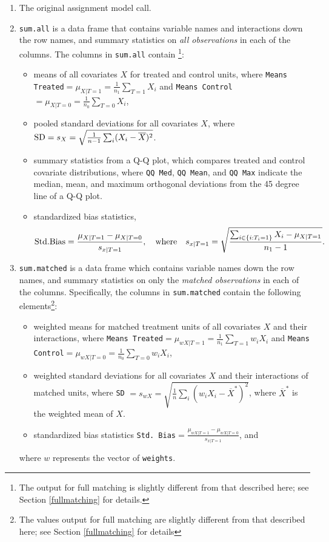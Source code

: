 \documentclass[oneside,letterpaper,titlepage]{article}
\begin{document}
\begin{enumerate}
\item The original assignment model call.
\item \texttt{sum.all} is a data frame that contains variable names
  and interactions down the row names, and summary statistics on
  \emph{all observations} in each of the columns.  The columns in
  \texttt{sum.all} contain \footnote{The output for full matching is
    slightly different from that described here; see Section
    \ref{fullmatching} for details.}:
  \begin{itemize}
  \item means of all covariates $X$ for treated and control units,
    where \texttt{Means Treated}$= \mu_{X|T=1} = \frac{1}{n_1}
    \sum_{T=1} X_i$ and \texttt{Means Control}$= \mu_{X|T=0} =
    \frac{1}{n_0} \sum_{T=0} X_i$,
  \item pooled standard deviations for all covariates $X$, where ${\rm
      SD} = s_X = \sqrt{\frac{1}{n-1} \sum_{i} (X_i -
      \overline{X})^2}$.
  \item summary statistics from a Q-Q plot, which compares treated and
    control covariate distributions, where \texttt{QQ Med}, \texttt{QQ
      Mean}, and \texttt{QQ Max} indicate the median, mean, and
    maximum orthogonal deviations from the 45 degree line of a Q-Q
    plot.
  \item standardized bias statistics, $${\rm Std.
      Bias}=\frac{\mu_{X|T=1} - \mu_{X|T=0}}{s_{x|T=1}}, \quad {\rm
      where} \quad s_{x|T=1} = \sqrt{\frac{\sum_{i \in \{i: T_i=1\}}
        X_i - \mu_{X|T=1}}{n_1-1} }.$$
  \end{itemize}
  
\item \texttt{sum.matched} is a data frame which contains variable
  names down the row names, and summary statistics on only the
  \emph{matched observations} in each of the columns.  Specifically,
  the columns in \texttt{sum.matched} contain the following
  elements\footnote{The values output for full matching are slightly
    different from that described here; see Section \ref{fullmatching}
    for details}:
  \begin{itemize}
  \item weighted means for matched treatment units of all covariates
    $X$ and their interactions, where \texttt{Means Treated}$=
    \mu_{wX|T=1} = \frac{1}{n_1} \sum_{T=1} w_iX_i$ and \texttt{Means
      Control}$=\mu_{wX|T=0} = \frac{1}{n_0} \sum_{T=0} w_iX_i$,
  \item weighted standard deviations for all covariates $X$ and their
    interactions of matched units, where \texttt{SD} $= s_{wX} =
    \sqrt{\frac{1}{n} \sum_{i} (w_iX_i - \overline{X}^*)^2}$, where
    $\overline{X}^*$ is the weighted mean of $X$.
  \item standardized bias statistics \texttt{Std.
      Bias}$=\frac{\mu_{wX|T=1} - \mu_{wX|T=0}}{s_{x|T=1}}$, and
  \end{itemize}
  where $w$ represents the vector of \texttt{weights}.
  

\end{enumerate}
\end{document}
